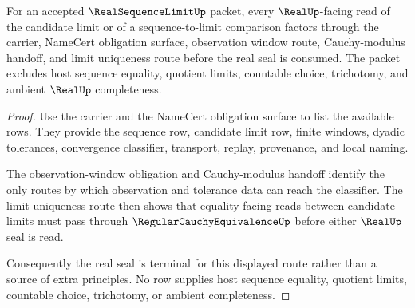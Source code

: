\begin{theorem}\label{thm:real-sequence-limit-real-seal-nonescape}
For an accepted $\RealSequenceLimitUp$ packet, every $\RealUp$-facing read of the candidate limit or of a sequence-to-limit comparison factors through the carrier, NameCert obligation surface, observation window route, Cauchy-modulus handoff, and limit uniqueness route before the real seal is consumed. The packet excludes host sequence equality, quotient limits, countable choice, trichotomy, and ambient $\RealUp$ completeness.
\end{theorem}
\begin{proof}
Use the carrier and the NameCert obligation surface to list the available rows. They provide the sequence row, candidate limit row, finite windows, dyadic tolerances, convergence classifier, transport, replay, provenance, and local naming.

The observation-window obligation and Cauchy-modulus handoff identify the only routes by which observation and tolerance data can reach the classifier. The limit uniqueness route then shows that equality-facing reads between candidate limits must pass through $\RegularCauchyEquivalenceUp$ before either $\RealUp$ seal is read.

Consequently the real seal is terminal for this displayed route rather than a source of extra principles. No row supplies host sequence equality, quotient limits, countable choice, trichotomy, or ambient completeness.
\end{proof}

